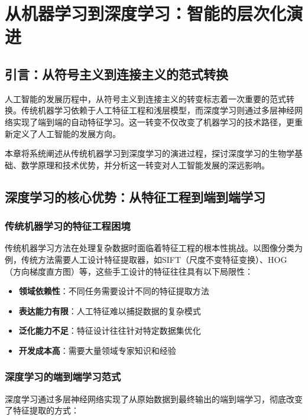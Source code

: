 \chapter{从机器学习到深度学习：智能的层次化演进}

\section{引言：从符号主义到连接主义的范式转换}

人工智能的发展历程中，从符号主义到连接主义的转变标志着一次重要的范式转换。传统机器学习依赖于人工特征工程和浅层模型，而深度学习则通过多层神经网络实现了端到端的自动特征学习。这一转变不仅改变了机器学习的技术路径，更重新定义了人工智能的发展方向。

本章将系统阐述从传统机器学习到深度学习的演进过程，探讨深度学习的生物学基础、数学原理和技术优势，并分析这一转变对人工智能发展的深远影响。

\section{深度学习的核心优势：从特征工程到端到端学习}

\subsection{传统机器学习的特征工程困境}

传统机器学习方法在处理复杂数据时面临着特征工程的根本性挑战。以图像分类为例，传统方法需要人工设计特征提取器，如SIFT（尺度不变特征变换）、HOG（方向梯度直方图）等，这些手工设计的特征往往具有以下局限性：

\begin{itemize}
\item {\bf 领域依赖性}：不同任务需要设计不同的特征提取方法
\item {\bf 表达能力有限}：人工特征难以捕捉数据的复杂模式
\item {\bf 泛化能力不足}：特征设计往往针对特定数据集优化
\item {\bf 开发成本高}：需要大量领域专家知识和经验
\end{itemize}

\subsection{深度学习的端到端学习范式}

深度学习通过多层神经网络实现了从原始数据到最终输出的端到端学习，彻底改变了特征提取的方式：

